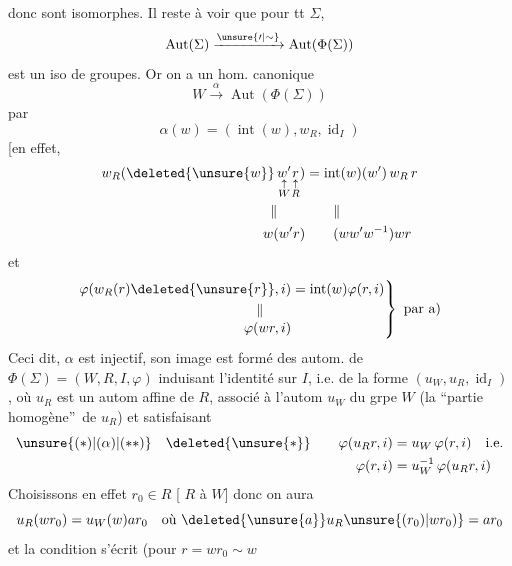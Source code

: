 donc sont isomorphes. Il reste à voir que pour tt $\Sigma$,
\[
\operatorname{Aut}(\Sigma)\xrightarrow{\unsure{\prime|\sim}}\operatorname{Aut}(\Phi(\Sigma))
\]
est un iso de groupes. Or on a un hom. canonique
\[
W\xrightarrow{\alpha}\operatorname{Aut}(\Phi(\Sigma))
\]
par
\[
\alpha(w)=(\operatorname{int}(w),w_R,\operatorname{id}_I)
\]
[en effet,
\[
\begin{aligned}
w_R(\deleted{\unsure{w}}\,\underset{\substack{\uparrow\\W}}{w'}\underset{\substack{\uparrow\\R}}{r})&=\operatorname{int}(w)(w')\,w_R\,r\\
\Vert\qquad &\qquad\Vert\\
w(w'r)&\qquad(ww'w^{-1})wr
\end{aligned}
\]
et
\[
\left.\begin{aligned}
\varphi(w_R(r)\deleted{\unsure{r}},i)&=\operatorname{int}(w)\varphi(r,i)\\
\Vert\qquad &\\[-2pt]
\varphi(wr,i)&
\end{aligned}\right\}\ \text{par a)}
\]
Ceci dit, $\alpha$ est  injectif, son image est formé des autom.  de $\Phi(\Sigma)=(W,R,I,\varphi)$ induisant l'identité sur $I$, i.e. de la forme $(u_W,u_R,\operatorname{id}_I)$, où $u_R$ est un autom affine de $R$, associé à l'autom $u_W$ du grpe $W$ (la \textquotedblleft partie homogène\textquotedblright\ de $u_R$) et satisfaisant
\[
\begin{aligned}
\unsure{(*)|(\alpha)|(\ast\ast)}\quad \deleted{\unsure{*}}\qquad
\varphi(u_Rr,i)&=u_W\,\varphi(r,i)\quad\text{i.e.}\\
\varphi(r,i)&=u_W^{-1}\,\varphi(u_Rr,i)
\end{aligned}
\]
Choisissons en effet $r_0\in R$ [  $R$ à $W$] donc on aura
\[
u_R(wr_0)=u_W(w)ar_0\quad\text{où }\deleted{\unsure{a}}u_R\unsure{(r_0)|wr_0)}=ar_0
\]
et la condition \unsure{$(*)$|$(\alpha)$|$(\ast\ast)$}  s'écrit (pour $r=wr_0\sim w$

